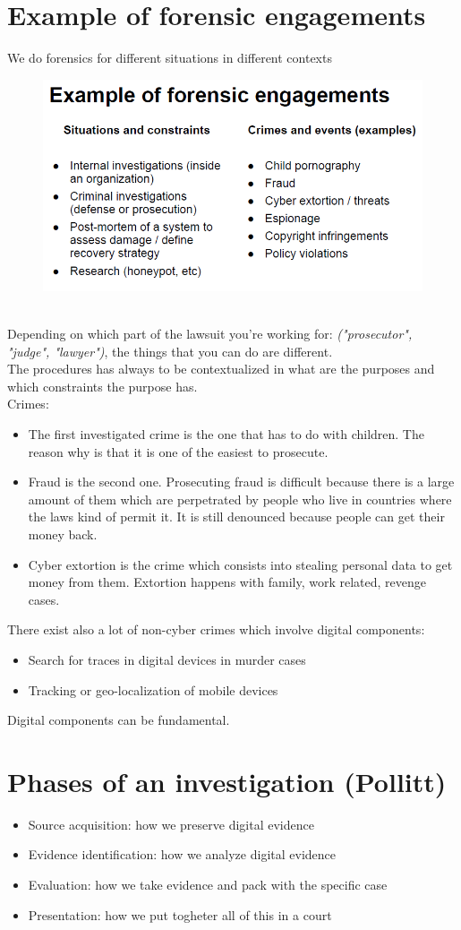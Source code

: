 \section{Example of forensic engagements}
    We do forensics for different situations in different contexts
    \begin{figure}[ht!]
        \centering
        \includegraphics[width=0.5\linewidth]{lecture_3/forensics.png}
    \end{figure}
    \\Depending on which part of the lawsuit you're working for: \textit{("prosecutor", "judge", "lawyer")}, the things that you can do are different.\\
    The procedures has always to be contextualized in what are the purposes and which constraints the purpose has. \\       
    Crimes:
        \begin{itemize}
            \item The first investigated crime is the one that has to do with children. The reason why is that it is one of the easiest to prosecute.
            \item Fraud is the second one. Prosecuting fraud is difficult because there is a large amount of them which are perpetrated by people who live in countries where the laws kind of permit it. It is still denounced because people can get their money back.
            \item Cyber extortion is the crime which consists into stealing personal data to get money from them. Extortion happens with family, work related, revenge cases.
        \end{itemize}
    There exist also a lot of non-cyber crimes which involve digital components:
        \begin{itemize}
            \item Search for traces in digital devices in murder cases
            \item Tracking or geo-localization of mobile devices
        \end{itemize}
    Digital components can be fundamental.
\section{Phases of an investigation (Pollitt)}
    \begin{itemize}
        \item Source acquisition: how we preserve digital evidence
        \item Evidence identification: how we analyze digital evidence 
        \item Evaluation: how we take evidence and pack with the specific case
        \item Presentation: how we put togheter all of this in a court
    \end{itemize}